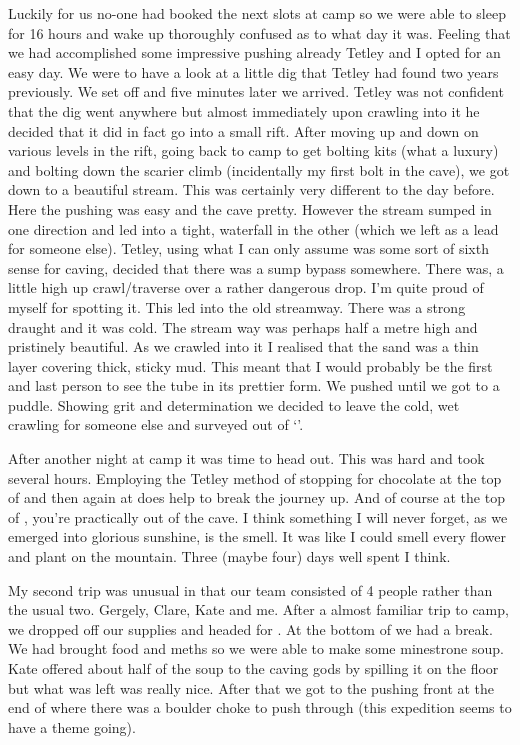 Luckily for us no-one had booked the next slots at camp so we were able to sleep for 16 hours and wake up thoroughly confused as to what day it was. Feeling that we had accomplished some impressive pushing already Tetley and I opted for an easy day. We were to have a look at a little dig that Tetley had found two years previously. We set off and five minutes later we arrived. Tetley was not confident that the dig went anywhere but almost immediately upon crawling into it he decided that it did in fact go into a small rift. After moving up and down on various levels in the rift, going back to camp to get bolting kits (what a luxury) and bolting down the scarier climb (incidentally my first bolt in the cave), we got down to a beautiful stream. This was certainly very different to the day before. Here the pushing was easy and the cave pretty. However the stream sumped in one direction and led into a tight, waterfall in the other (which we left as a lead for someone else). Tetley, using what I can only assume was some sort of sixth sense for caving, decided that there was a sump bypass somewhere. There was, a little high up crawl/traverse over a rather dangerous drop. I’m quite proud of myself for spotting it. This led into the old streamway. There was a strong draught and it was cold. The stream way was perhaps half a metre high and pristinely beautiful. As we crawled into it I realised that the sand was a thin layer covering thick, sticky mud. This meant that I would probably be the first and last person to see the tube in its prettier form. We pushed until we got to a puddle. Showing grit and determination we decided to leave the cold, wet crawling for someone else and surveyed out of ‘’.


After another night at camp it was time to head out. This was hard and took several hours. Employing the Tetley method of stopping for chocolate at the top of  and then again at  does help to break the journey up. And of course at the top of , you’re practically out of the cave. I think something I will never forget, as we emerged into glorious sunshine, is the smell. It was like I could smell every flower and plant on the mountain. Three (maybe four) days well spent I think.

My second trip was unusual in that our team consisted of 4 people rather than the usual two. Gergely, Clare, Kate and me. After a almost familiar trip to camp, we dropped off our supplies and headed for . At the bottom of  we had a break. We had brought food and meths so we were able to make some minestrone soup. Kate offered about half of the soup to the caving gods by spilling it on the floor but what was left was really nice. After that we got to the pushing front at the end of  where there was a boulder choke to push through (this expedition seems to have a theme going). 


